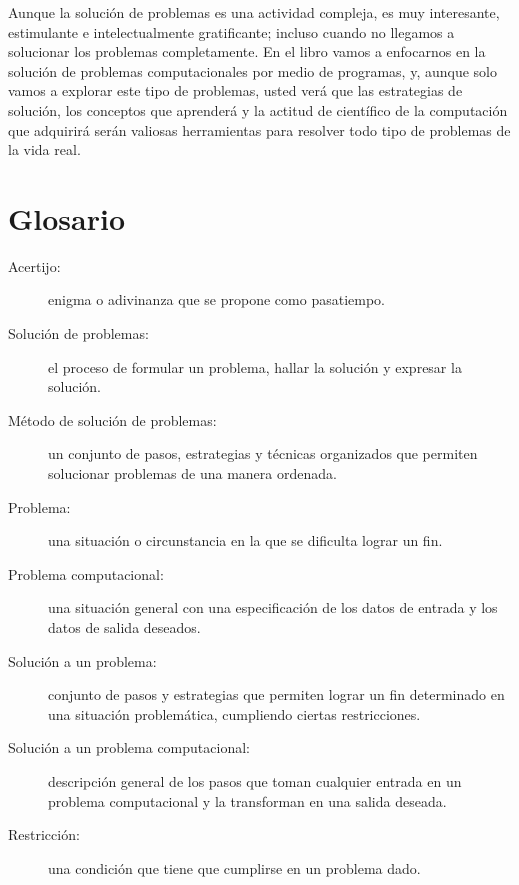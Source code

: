Aunque la solución de problemas es una actividad compleja, es muy interesante,
estimulante e intelectualmente gratificante; incluso cuando no llegamos a 
solucionar los problemas completamente. En el libro vamos a enfocarnos
en la solución de problemas computacionales por medio de programas, y, aunque
solo vamos a explorar este tipo de problemas, usted verá que las estrategias
de solución, los conceptos que aprenderá y la actitud de científico de la
computación que adquirirá serán valiosas herramientas para resolver todo tipo
de problemas de la vida real.


\section{Glosario}

\begin{description}
	\item[Acertijo:] enigma o adivinanza que se propone como pasatiempo.
	
	\item[Solución de problemas:]  el proceso de formular un problema,
	hallar la solución y expresar la solución.
	
	\item[Método de solución de problemas:] un conjunto de pasos, estrategias y 
	técnicas
	organizados que permiten solucionar problemas de una manera ordenada.
	
	\item[Problema:] una situación o circunstancia en la que se dificulta 
	lograr un
	fin. 
	
	\item[Problema computacional:] una situación general con una especificación 
	de los 
	datos de entrada y los datos de  salida deseados.
	
	\item[Solución a un problema:] conjunto de pasos y estrategias que permiten 
	lograr
	un fin determinado en una situación problemática, cumpliendo ciertas 
	restricciones.
	
	\item[Solución a un problema computacional:] descripción general de los 
	pasos
	que toman cualquier entrada en un problema computacional y la transforman
	en una salida deseada.
	
	\item[Restricción:] una condición que tiene que cumplirse en un problema 
	dado.
	
\end{description}

